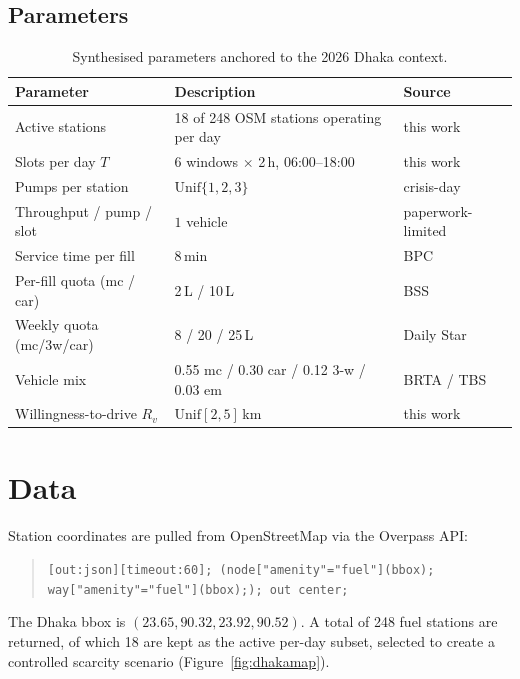 \documentclass[11pt,a4paper]{article}
\begin{document}
\subsection{Parameters}
\begin{table}[H]
\centering\small
\begin{tabularx}{\linewidth}{lXl}
\toprule
\textbf{Parameter} & \textbf{Description} & \textbf{Source} \\
\midrule
Active stations            & 18 of 248 OSM stations operating per day   & this work \\
Slots per day $T$          & 6 windows $\times$ 2\,h, 06:00--18:00      & this work \\
Pumps per station          & $\mathrm{Unif}\{1,2,3\}$                   & crisis-day \\
Throughput / pump / slot   & $1$ vehicle                                 & paperwork-limited \\
Service time per fill      & 8\,min                                      & BPC \cite{bsslimit} \\
Per-fill quota (mc / car)  & 2\,L / 10\,L                               & BSS \cite{bsslimit} \\
Weekly quota (mc/3w/car)   & 8 / 20 / 25\,L                              & Daily Star \cite{bssweekly} \\
Vehicle mix                & 0.55 mc / 0.30 car / 0.12 3-w / 0.03 em    & BRTA / TBS \cite{brta,tbsmix} \\
Willingness-to-drive $R_v$ & $\mathrm{Unif}[2,5]$\,km                   & this work \\
\bottomrule
\end{tabularx}
\caption{Synthesised parameters anchored to the 2026 Dhaka context.}
\end{table}

\section{Data}

Station coordinates are pulled from OpenStreetMap via the Overpass API:
\begin{quote}\small
\texttt{[out:json][timeout:60]; (node["amenity"="fuel"](bbox); way["amenity"="fuel"](bbox);); out center;}
\end{quote}
The Dhaka bbox is $(23.65, 90.32, 23.92, 90.52)$. A total of 248 fuel
stations are returned, of which 18 are kept as the active per-day subset,
selected to create a controlled scarcity scenario (Figure~\ref{fig:dhakamap}).
\end{document}
